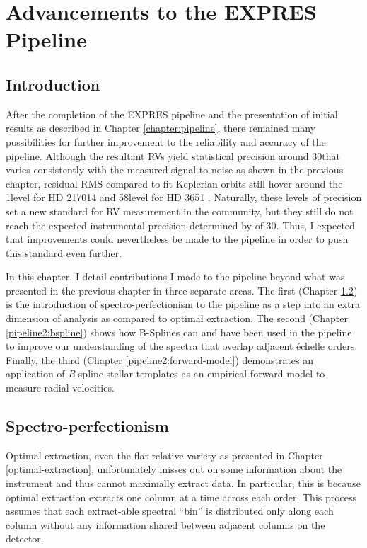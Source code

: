 \chapter{Advancements to the EXPRES Pipeline} \label{chapter:pipeline2}

\section{Introduction}

After the completion of the EXPRES pipeline and the presentation of initial results as described in Chapter \ref{chapter:pipeline}, there remained many possibilities for further improvement to the reliability and accuracy of the pipeline. Although the resultant RVs yield statistical precision around 30\cms that varies consistently with the measured signal-to-noise as shown in the previous chapter, residual RMS compared to fit Keplerian orbits still hover around the 1\ms level for HD 217014 \citep{petersburg_extreme-precision_2020} and 58\cms level for HD 3651 \citep{brewer_expres_2020}. Naturally, these levels of precision set a new standard for RV measurement in the community, but they still do not reach the expected instrumental precision determined by \citet{blackman_performance_2020} of 30\cms. Thus, I expected that improvements could nevertheless be made to the pipeline in order to push this standard even further.

In this chapter, I detail contributions I made to the pipeline beyond what was presented in the previous chapter in three separate areas. The first (Chapter \ref{pipeline2:spec-perf}) is the introduction of spectro-perfectionism to the pipeline as a step into an extra dimension of analysis as compared to optimal extraction. The second (Chapter \ref{pipeline2:bspline}) shows how B-Splines can and have been used in the pipeline to improve our understanding of the spectra that overlap adjacent \'{e}chelle orders. Finally, the third (Chapter \ref{pipeline2:forward-model}) demonstrates an application of \textit{B}-spline stellar templates as an empirical forward model to measure radial velocities.

\section{Spectro-perfectionism} \label{pipeline2:spec-perf}

Optimal extraction, even the flat-relative variety as presented in Chapter \ref{optimal-extraction}, unfortunately misses out on some information about the instrument and thus cannot maximally extract data. In particular, this is because optimal extraction extracts one column at a time across each order. This process assumes that each extract-able spectral ``bin'' is distributed only along each column without any information shared between adjacent columns on the detector.

